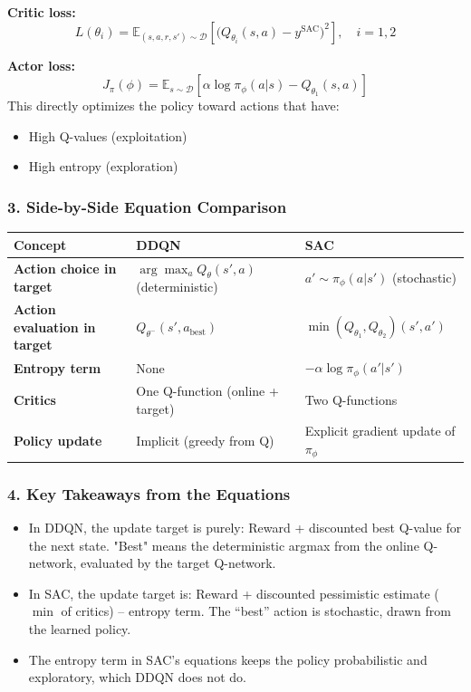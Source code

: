 \documentclass[12pt]{article}
\begin{document}
\textbf{Critic loss:}
$$ L(\theta_i) = \mathbb{E}_{(s,a,r,s') \sim \mathcal{D}} \left[ \big( Q_{\theta_i}(s,a) - y^{\text{SAC}} \big)^2 \right], \quad i = 1, 2 $$

\textbf{Actor loss:}
$$ J_\pi(\phi) = \mathbb{E}_{s \sim \mathcal{D}} \left[ \alpha \log \pi_\phi(a|s) - Q_{\theta_1}(s,a) \right] $$
This directly optimizes the policy toward actions that have:
\begin{itemize}
    \item High Q-values (exploitation)
    \item High entropy (exploration)
\end{itemize}

\subsubsection*{3. Side-by-Side Equation Comparison}
\begin{tabular}{|l|l|l|}
\hline
\textbf{Concept} & \textbf{DDQN} & \textbf{SAC} \\
\hline
\textbf{Action choice in target} & $\arg\max_a Q_\theta(s',a)$ (deterministic) & $a' \sim \pi_\phi(a|s')$ (stochastic) \\
\hline
\textbf{Action evaluation in target} & $Q_{\theta^-}(s', a_{\text{best}})$ & $\min(Q_{\theta_1}, Q_{\theta_2})(s',a')$ \\
\hline
\textbf{Entropy term} & None & $-\alpha \log \pi_\phi(a'|s')$ \\
\hline
\textbf{Critics} & One Q-function (online + target) & Two Q-functions \\
\hline
\textbf{Policy update} & Implicit (greedy from Q) & Explicit gradient update of $\pi_\phi$ \\
\hline
\end{tabular}

\subsubsection*{4. Key Takeaways from the Equations}
\begin{itemize}
    \item In DDQN, the update target is purely: Reward + discounted best Q-value for the next state. "Best" means the deterministic argmax from the online Q-network, evaluated by the target Q-network.
    \item In SAC, the update target is: Reward + discounted pessimistic estimate ($\min$ of critics) -- entropy term. The ``best'' action is stochastic, drawn from the learned policy.
    \item The entropy term in SAC's equations keeps the policy probabilistic and exploratory, which DDQN does not do.
\end{itemize}
\end{document}
